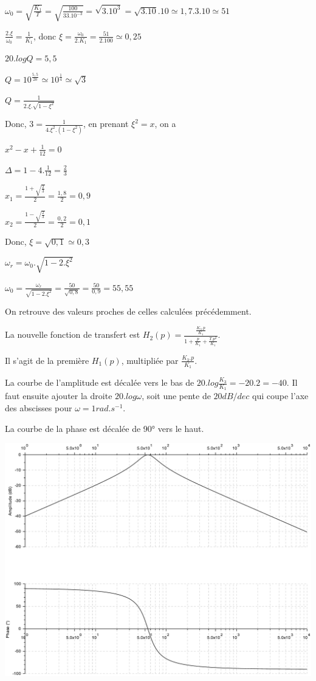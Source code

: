 \cor

$\omega_0=\sqrt{\frac{K_1}{T}}=\sqrt{\frac{100}{33.10^{-3}}}=\sqrt{3.10^3}=\sqrt{3.10}.10\simeq 1,7.3.10 \simeq 51$

$\frac{2.\xi}{\omega_0}=\frac{1}{K_1}$, donc $\xi=\frac{\omega_0}{2.K_1}=\frac{51}{2.100}\simeq0,25$

\cor

$20.logQ=5,5$

$Q=10^{\frac{5,5}{20}}\simeq 10^{\frac{1}{4}}\simeq\sqrt{3}$

$Q=\frac{1}{2.\xi.\sqrt{1-\xi^2}}$

Donc, $3=\frac{1}{4.\xi^2.(1-\xi^2)}$, en prenant $\xi^2=x$, on a 

$x^2-x+\frac{1}{12}=0$

$\Delta=1-4.\frac{1}{12}=\frac{2}{3}$

$x_1=\frac{1+\sqrt{\frac{2}{3}}}{2}=\frac{1,8}{2}=0,9$

$x_2=\frac{1-\sqrt{\frac{2}{3}}}{2}=\frac{0,2}{2}=0,1$

Donc, $\xi=\sqrt{0,1}\simeq 0,3$

$\omega_r=\omega_0.\sqrt{1-2.\xi^2}$

$\omega_0=\frac{\omega_r}{\sqrt{1-2.\xi^2}}=\frac{50}{\sqrt{0,8}}=\frac{50}{0,9}=55,55$

On retrouve des valeurs proches de celles calculées précédemment.

\cor

La nouvelle fonction de transfert est $H_2(p)=\frac{\frac{K_3.p}{K_1}}{1+\frac{p}{K_1}+\frac{T.p^2}{K_1}}$.

Il s'agit de la première $H_1(p)$, multipliée par $\frac{K_3.p}{K_1}$.

La courbe de l'amplitude est décalée vers le bas de $20.log\frac{K_3}{K_1}=-20.2=-40$. Il faut ensuite ajouter la droite $20.log\omega$, soit une pente de $20dB/dec$ qui coupe l'axe des abscisses pour $\omega=1rad.s^{-1}$.

La courbe de la phase est décalée de 90° vers le haut.

\begin{center}
 \includegraphics[width=0.9\linewidth]{img/bode2_cor}
\end{center}

